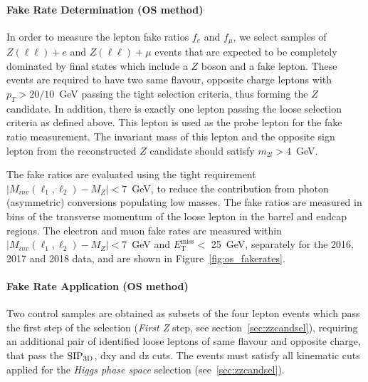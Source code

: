 \paragraph{Fake Rate Determination (OS method)}
In order to measure the lepton fake ratios $f_{e}$ and $f_{\mu}$, we select samples of $Z(\ell\ell)+e$ and $Z(\ell\ell)+\mu$ events that are expected to be completely dominated by final states which include a $Z$ boson and a fake lepton. 
These events are required to have two same flavour, opposite charge leptons with $p_{T} > 20/10$~GeV passing the tight selection criteria, thus forming the $Z$ candidate. In addition, there is exactly one lepton passing the loose selection criteria as defined above. 
This lepton is used as the probe lepton for the fake ratio measurement. The invariant mass of this lepton and the opposite sign lepton from the reconstructed $Z$ candidate should satisfy $m_{2l} > 4$~GeV. 


The fake ratios are evaluated using the tight requirement 
$|M_{inv}(\ell_{1},\ell_{2}) - M_{Z}| < 7 $~GeV, to reduce the 
contribution from photon (asymmetric) conversions populating low masses. 
The fake ratios are measured in bins of the transverse momentum of the loose lepton in the barrel and endcap regions. 
The electron and muon fake rates are measured within 
$|M_{inv}(\ell_{1},\ell_{2}) - M_{Z}| < 7 $~GeV and $E_{\mathrm{T}}^\text{miss}  < $ 25~GeV, 
separately for the 2016, 2017 and 2018 data, and are shown in Figure~\ref{fig:os_fakerates}. 


\paragraph{Fake Rate Application (OS method)}
\label{sec:zxA}

Two control samples are obtained as subsets of the four lepton events
which pass the first step of the selection ({\it First Z} step, see
section~\ref{sec:zzcandsel}), requiring an additional pair of identified
loose leptons of same flavour 
and opposite charge, that pass the ${\rm SIP_{3D}}$, dxy and dz cuts. 
The events must satisfy all kinematic cuts applied for the {\it Higgs phase space} selection
(see~\ref{sec:zzcandsel}).

